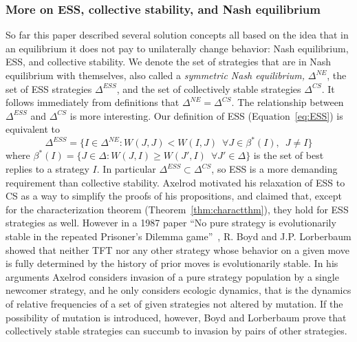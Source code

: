 \subsubsection{More on ESS, collective stability, and Nash equilibrium}
So far this paper described several solution concepts all based on the idea that in an equilibrium it does not pay to unilaterally change behavior: Nash equilibrium, ESS, and collective stability. We denote the set of strategies that are in Nash equilibrium with themselves, also called a \textit{symmetric Nash equilibrium,} $\Delta^{NE}$, the set of ESS strategies $\Delta^{ESS}$, and the set of collectively stable strategies $\Delta^{CS}$. It follows immediately from definitions that $\Delta^{NE} = \Delta^{CS}$. The relationship between $\Delta^{ESS}$ and $\Delta^{CS}$ is more interesting. Our definition of ESS (Equation~\ref{eq:ESS}) is equivalent to
\[
\Delta^{ESS} = \{I \in \Delta^{NE} : W(J, J) < W(I, J) \enspace \forall J \in \beta^*(I),\enspace J\neq I \}
\]
where $\beta^*(I) = \{J \in \Delta : W(J, I) \geq W(J', I) \enspace \forall J' \in \Delta\}$ is the set of best replies to a strategy $I$. In particular $\Delta^{ESS} \subset \Delta^{CS}$, so ESS is a more demanding requirement than collective stability. Axelrod motivated his relaxation of ESS to CS as a way to simplify the proofs of his propositions, and claimed that, except for the characterization theorem (Theorem~\ref{thm:charactthm}), they hold for ESS strategies as well. However in a 1987 paper ``No pure strategy is evolutionarily stable in the repeated Prisoner's Dilemma game''~\cite{Boyd_Lorberbaum_1987}, R. Boyd and J.P. Lorberbaum showed that neither TFT nor any other strategy whose behavior on a given move is fully determined by the history of prior moves is evolutionarily stable. In his arguments Axelrod considers invasion of a pure strategy population by a single newcomer strategy, and he only considers ecologic dynamics, that is the dynamics of relative frequencies of a set of given strategies not altered by mutation. If the possibility of mutation is introduced, however, Boyd and Lorberbaum prove that collectively stable strategies can succumb to invasion by pairs of other strategies.

